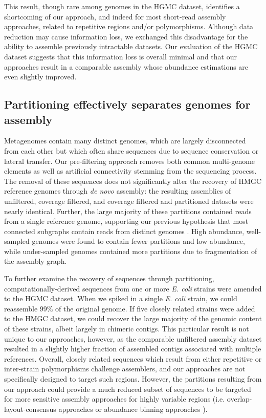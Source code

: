 \documentclass{pnastwo}
\begin{document}
\begin{article}
This result, though rare among genomes in the HGMC dataset, identifies a
shortcoming of our approach, and indeed for most short-read assembly approaches,
related to repetitive regions and/or polymorphisms. Although data reduction may
cause information loss, we exchanged this disadvantage for the ability to
assemble previously intractable datasets. Our evaluation of the HGMC dataset
suggests that this information loss is overall minimal and that our approaches
result in a comparable assembly whose abundance estimations are even slightly
improved.

\subsection{Partitioning effectively separates genomes for assembly}
Metagenomes contain many distinct genomes, which are largely disconnected from
each other but which often share sequences due to sequence conservation or
lateral transfer. Our pre-filtering approach removes both common multi-genome
elements as well as artificial connectivity stemming from the sequencing
process. The removal of these sequences does not significantly alter the
recovery of HMGC reference genomes through {\em de novo} assembly: the resulting
assemblies of unfiltered, coverage filtered, and coverage filtered and
partitioned datasets were nearly identical. Further, the large majority of these
partitions contained reads from a single reference genome, supporting our
previous hypothesis that most connected subgraphs contain reads from distinct
genomes \cite{Pell:2012cq}. High abundance, well-sampled genomes were found to
contain fewer partitions and low abundance, while under-sampled genomes
contained more partitions due to fragmentation of the assembly graph.

To further examine the recovery of sequences through partitioning,
computationally-derived sequences from one or more \emph{E. coli} strains were
amended to the HGMC dataset. When we spiked in a single \emph{E. coli} strain,
we could reassemble 99\% of the original genome. If five closely related strains
were added to the HMGC dataset, we could recover the large majority of the
genomic content of these strains, albeit largely in chimeric contigs. This particular
result is not unique to our approaches, however, as the comparable unfiltered assembly 
dataset resulted in a slightly higher fraction of assembled contigs associated
with multiple references. Overall, closely related sequences which result from
either repetitive or inter-strain polymorphisms challenge assemblers, and our
approaches are not specifically designed to target such regions. However, the
partitions resulting from our approach could provide a much reduced subset of
sequences to be targeted for more sensitive assembly approaches for highly
variable regions (i.e. overlap-layout-consensus approaches or abundance binning
approaches \cite{Sharon:2012kx}).


\end{article}
\end{document}
